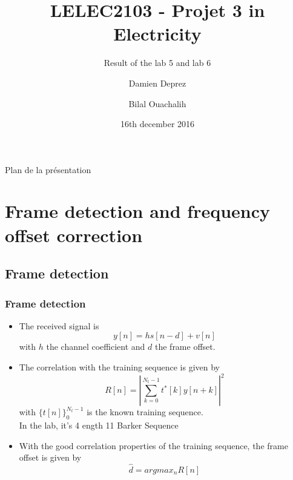 \documentclass[11pt]{beamer}
\title{LELEC2103 - Projet 3 in Electricity}
\subtitle[\ldots]{Result of the lab 5 and lab 6}
\author[D. Deprez\and B. Ouachalih]{Damien Deprez\and Bilal Ouachalih}
\institute{EPL}
\date{16th december 2016}
\begin{document}
{
	\begin{frame}[noframenumbering]
		\titlepage
	\end{frame}
} 

{
	\begin{frame}[noframenumbering]{Plan de la présentation}
		\tableofcontents
	\end{frame}
}

\section{Frame detection and frequency offset correction}

\subsection{Frame detection}

\begin{frame}
\frametitle{Frame detection}
\begin{itemize}
\item The received signal is
\begin{equation}
y[n] = hs[n-d] + v[n]
\end{equation}
with $h$ the channel coefficient and $d$ the frame offset.
\item The correlation with the training sequence is given by
\begin{equation}
R[n] = \left| \sum_{k=0}^{N_t-1} t^*[k]y[n+k] \right|^2
\end{equation}
with $\{t[n]\}_0^{N_t-1}$ is the known training sequence. \\
In the lab, it's 4 ength 11 Barker Sequence
\item With the good correlation properties of the training sequence, the frame offset is given by 
\begin{equation}
\hat{d} = argmax_n{R[n]}
\end{equation}
\end{itemize}

\end{frame}
\end{document}
